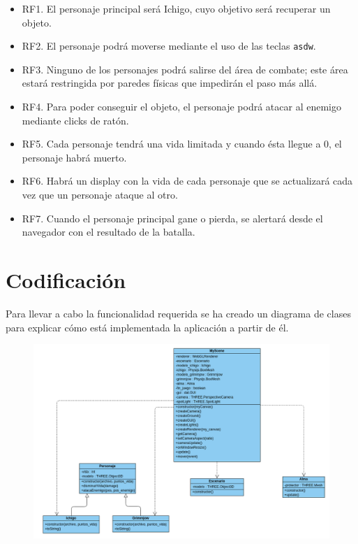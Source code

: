 \documentclass[11pt,a4paper]{article}
\begin{document}
\begin{itemize}
	\item RF1. El personaje principal será Ichigo, cuyo objetivo será recuperar un objeto.
	\item RF2. El personaje podrá moverse mediante el uso de las teclas \color{morado}\texttt{asdw}\color{black}.
	\item RF3. Ninguno de los personajes podrá salirse del área de combate; este área estará restringida por paredes físicas que impedirán el paso más allá.
	\item RF4. Para poder conseguir el objeto, el personaje podrá atacar al enemigo mediante clicks de ratón.
	\item RF5. Cada personaje tendrá una vida limitada y cuando ésta llegue a 0, el personaje habrá muerto.
	\item RF6. Habrá un display con la vida de cada personaje que se actualizará cada vez que un personaje ataque al otro.
	\item RF7. Cuando el personaje principal gane o pierda, se alertará desde el navegador con el resultado de la batalla.
\end{itemize}

\section{Codificación}

Para llevar a cabo la funcionalidad requerida se ha creado un diagrama de clases para explicar cómo está implementada la aplicación a partir de él.

\begin{figure}[H]
	\centering
	\includegraphics[scale=0.4]{img/diagrama.png}
\end{figure}
\end{document}
